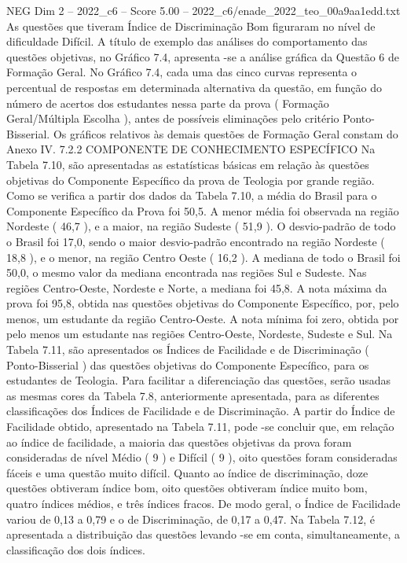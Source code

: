 \begin{textsample}{NEG Dim 2 – 2022\_c6 – Score 5.00 – 2022\_c6/enade\_2022\_teo\_00a9aa1edd.txt}
As questões que tiveram Índice de Discriminação Bom figuraram no nível de dificuldade Difícil.
A título de exemplo das análises do comportamento das questões objetivas, no Gráfico 7.4, apresenta -se a análise gráfica da Questão 6 de Formação Geral.
No Gráfico 7.4, cada uma das cinco curvas representa o percentual de respostas em determinada alternativa da questão, em função do número de acertos dos estudantes nessa parte da prova ( Formação Geral/Múltipla Escolha ), antes de possíveis eliminações pelo critério Ponto-Bisserial.
Os gráficos relativos às demais questões de Formação Geral constam do Anexo IV. 7.2.2 COMPONENTE DE CONHECIMENTO ESPECÍFICO Na Tabela 7.10, são apresentadas as estatísticas básicas em relação às questões objetivas do Componente Específico da prova de Teologia por grande região.
Como se verifica a partir dos dados da Tabela 7.10, a média do Brasil para o Componente Específico da Prova foi 50,5.
A menor média foi observada na região Nordeste ( 46,7 ), e a maior, na região Sudeste ( 51,9 ).
O desvio-padrão de todo o Brasil foi 17,0, sendo o maior desvio-padrão encontrado na região Nordeste ( 18,8 ), e o menor, na região Centro Oeste ( 16,2 ).
A mediana de todo o Brasil foi 50,0, o mesmo valor da mediana encontrada nas regiões Sul e Sudeste.
Nas regiões Centro-Oeste, Nordeste e Norte, a mediana foi 45,8.
A nota máxima da prova foi 95,8, obtida nas questões objetivas do Componente Específico, por, pelo menos, um estudante da região Centro-Oeste.
A nota mínima foi zero, obtida por pelo menos um estudante nas regiões Centro-Oeste, Nordeste, Sudeste e Sul.
Na Tabela 7.11, são apresentados os Índices de Facilidade e de Discriminação ( Ponto-Bisserial ) das questões objetivas do Componente Específico, para os estudantes de Teologia.
Para facilitar a diferenciação das questões, serão usadas as mesmas cores da Tabela 7.8, anteriormente apresentada, para as diferentes classificações dos Índices de Facilidade e de Discriminação.
A partir do Índice de Facilidade obtido, apresentado na Tabela 7.11, pode -se concluir que, em relação ao índice de facilidade, a maioria das questões objetivas da prova foram consideradas de nível Médio ( 9 ) e Difícil ( 9 ), oito questões foram consideradas fáceis e uma questão muito difícil.
Quanto ao índice de discriminação, doze questões obtiveram índice bom, oito questões obtiveram índice muito bom, quatro índices médios, e três índices fracos.
De modo geral, o Índice de Facilidade variou de 0,13 a 0,79 e o de Discriminação, de 0,17 a 0,47.
Na Tabela 7.12, é apresentada a distribuição das questões levando -se em conta, simultaneamente, a classificação dos dois índices.

\end{textsample}

